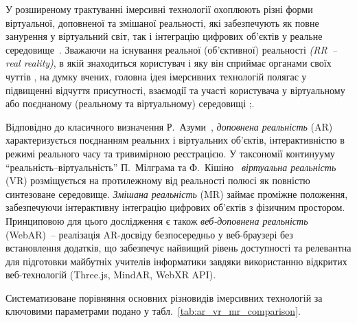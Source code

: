 У розширеному трактуванні імерсивні технології охоплюють різні форми віртуальної, доповненої та змішаної реальності, які забезпечують як повне занурення у віртуальний світ, так і інтеграцію цифрових об'єктів у реальне середовище~\cite{DiNatale2020Immersive}. Зважаючи на існування реальної (об'єктивної) реальності \emph{(RR~-- real reality)}, в якій знаходиться користувач і яку він сприймає органами своїх чуттів \cite{Omelchuk2024Secondary}, на думку вчених, головна ідея імерсивних технологій полягає у підвищенні відчуття присутності, взаємодії та участі користувача у віртуальному або поєднаному (реальному та віртуальному) середовищі \cite{Omelchuk2024Secondary};\cite{Semerikov2021Ref}.

Відповідно до класичного визначення Р.~Азуми~\cite{TechGlossaryAR2020}, \emph{доповнена реальність} (AR) характеризується поєднанням реальних і віртуальних об'єктів, інтерактивністю в режимі реального часу та тривимірною реєстрацією. У таксономії континууму ``реальність--віртуальність'' П.~Мілграма та Ф.~Кішіно~\cite{KVR2017Definition} \emph{віртуальна реальність} (VR) розміщується на протилежному від реальності полюсі як повністю синтезоване середовище. \emph{Змішана реальність} (MR) займає проміжне положення, забезпечуючи інтерактивну інтеграцію цифрових об'єктів з фізичним простором. Принциповою для цього дослідження є також \emph{веб-доповнена реальність} (WebAR)~-- реалізація AR-досвіду безпосередньо у веб-браузері без встановлення додатків, що забезпечує найвищий рівень доступності та релевантна для підготовки майбутніх учителів інформатики завдяки використанню відкритих веб-технологій (Three.js, MindAR, WebXR API).

Систематизоване порівняння основних різновидів імерсивних технологій за ключовими параметрами подано у табл.~\ref{tab:ar_vr_mr_comparison}.

